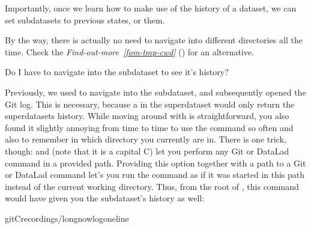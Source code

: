 \sphinxAtStartPar
Importantly, once we learn how to make use of the history of a dataset,
we can set subdatasets to previous states, or  them.

\sphinxAtStartPar
By the way, there is actually no need to navigate into different directories all the time.
Check the \textit{Find-out-more}~{\findoutmoreiconinline}\textit{\ref{fom-tmp-cwd}} {\hyperref[\detokenize{basics/101-106-nesting:fom-tmp-cwd}]{}} () for
an alternative.

\ignorespaces \begin{findoutmore}[label={fom-tmp-cwd}, before title={\thetcbcounter\ }, float, floatplacement=tb, check odd page=true]{Do I have to navigate into the subdataset to see it’s history?}
\label{\detokenize{basics/101-106-nesting:fom-tmp-cwd}}

\sphinxAtStartPar
Previously, we used  to navigate into the subdataset, and
subsequently opened the Git log. This is necessary, because a 
in the superdataset would only return the superdatasets history.
While moving around with  is straightforward, you also found it
slightly annoying from time to time to use the  command so often and also
to remember in which directory you currently are in. There is one
trick, though:  and  (note that it is a capital C) let you perform any
Git or DataLad command in a provided path. Providing this option together with a path to
a Git or DataLad command let’s you run the command as if it was started in this path
instead of the current working directory.
Thus, from the root of , this command would have given you the
subdataset’s history as well:

\begin{sphinxVerbatim}[commandchars=\\\{\}]
git\PYGZhy{}Crecordings/longnowlog\PYGZhy{}\PYGZhy{}oneline
\end{sphinxVerbatim}


\end{findoutmore}

